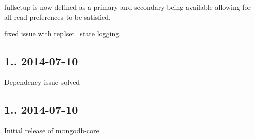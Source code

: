 \begin{DoxyItemize}
\item fullsetup is now defined as a primary and secondary being available allowing for all read preferences to be satisfied.
\item fixed issue with replset\+\_\+state logging.
\end{DoxyItemize}

\subsection*{1.. 2014-\/07-\/10 }


\begin{DoxyItemize}
\item Dependency issue solved
\end{DoxyItemize}

\subsection*{1.. 2014-\/07-\/10 }


\begin{DoxyItemize}
\item Initial release of mongodb-\/core 
\end{DoxyItemize}